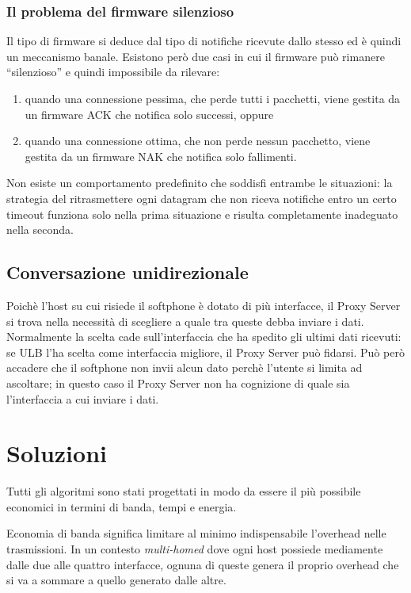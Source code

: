 \documentclass[12pt,a4paper,openright,twoside]{book}
\begin{document}
\subsubsection{Il problema del firmware silenzioso}
Il tipo di firmware si deduce dal tipo di notifiche ricevute dallo
stesso ed è quindi un meccanismo banale. Esistono però due casi in cui
il firmware può rimanere ``silenzioso'' e quindi impossibile da
rilevare:
\begin{enumerate}
\item quando una connessione pessima, che perde tutti i pacchetti,
  viene gestita da un firmware ACK che notifica solo successi, oppure
\item quando una connessione ottima, che non perde nessun pacchetto,
  viene gestita da un firmware NAK che notifica solo fallimenti.
\end{enumerate}
Non esiste un comportamento predefinito che soddisfi entrambe le
situazioni: la strategia del ritrasmettere ogni datagram che non
riceva notifiche entro un certo timeout funziona solo nella prima
situazione e risulta completamente inadeguato nella seconda.

\subsection{Conversazione unidirezionale}
Poichè l'host su cui risiede il softphone è dotato di più interfacce,
il Proxy Server si trova nella necessità di scegliere a quale tra
queste debba inviare i dati. Normalmente la scelta cade
sull'interfaccia che ha spedito gli ultimi dati ricevuti: se ULB l'ha
scelta come interfaccia migliore, il Proxy Server può fidarsi. Può
però accadere che il softphone non invii alcun dato perchè l'utente si
limita ad ascoltare; in questo caso il Proxy Server non ha cognizione
di quale sia l'interfaccia a cui inviare i dati.

\section{Soluzioni}
Tutti gli algoritmi sono stati progettati in modo da essere il più
possibile economici in termini di banda, tempi e energia.

Economia di banda significa limitare al minimo indispensabile
l'overhead nelle trasmissioni. In un contesto \emph{multi-homed} dove
ogni host possiede mediamente dalle due alle quattro interfacce,
ognuna di queste genera il proprio overhead che si va a sommare a
quello generato dalle altre.
\end{document}
